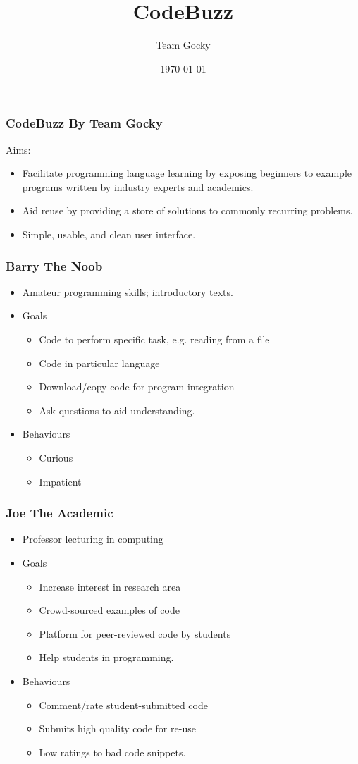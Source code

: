 \documentclass[handout, t]{beamer}
\title[DIM3 Project Presentation]{CodeBuzz}
\author{Team Gocky}
\institute{University Of Glasgow}
\date{\today}
\begin{document}
\begin{frame}
\frametitle{CodeBuzz By Team Gocky}
Aims:
\begin{itemize}
\item Facilitate programming language learning by exposing beginners to
example programs written by industry experts and academics.
\item Aid reuse by providing a store of solutions to commonly recurring
problems.
\item Simple, usable, and clean user interface.
\end{itemize}
\end{frame}

\begin{frame}
\frametitle{Barry The Noob}
\begin{itemize}
\item Amateur programming skills; introductory texts.
\item Goals
    \begin{itemize}
    \item Code to perform specific task, e.g. reading from a file
    \item Code in particular language
    \item Download/copy code for program integration
    \item Ask questions to aid understanding.
    \end{itemize}
\item Behaviours
    \begin{itemize}
    \item Curious
    \item Impatient
    \end{itemize}
\end{itemize}
\end{frame}

\begin{frame}
\frametitle{Joe The Academic}
\begin{itemize}
\item Professor lecturing in computing
\item Goals
    \begin{itemize}
    \item Increase interest in research area
    \item Crowd-sourced examples of code
    \item Platform for peer-reviewed code by students
    \item Help students in programming.
    \end{itemize}
\item Behaviours
    \begin{itemize}
    \item Comment/rate student-submitted code
    \item Submits high quality code for re-use
    \item Low ratings to bad code snippets.
    \end{itemize}
\end{itemize}
\end{frame}
\end{document}

